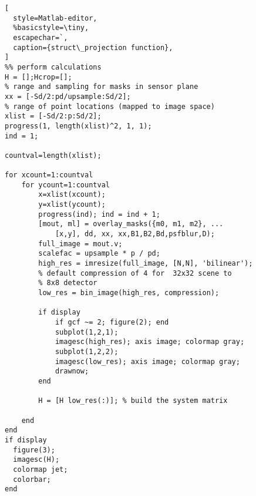 \begin{lstlisting}[
  style=Matlab-editor,
  %basicstyle=\tiny,
  escapechar=`,
  caption={struct\_projection function},
]
%% perform calculations
H = [];Hcrop=[];
% range and sampling for masks in sensor plane
xx = [-Sd/2:pd/upsample:Sd/2]; 
% range of point locations (mapped to image space)
xlist = [-Sd/2:p:Sd/2]; 
progress(1, length(xlist)^2, 1, 1);
ind = 1;

countval=length(xlist);

for xcount=1:countval
    for ycount=1:countval
        x=xlist(xcount);
        y=xlist(ycount);
        progress(ind); ind = ind + 1;
        [mout, ml] = overlay_masks({m0, m1, m2}, ...
            [x,y], dd, xx, xx,B1,B2,Bd,psfblur,D);
        full_image = mout.v;
        scalefac = upsample * p / pd;
        high_res = imresize(full_image, [N,N], 'bilinear');
        % default compression of 4 for  32x32 scene to 
        % 8x8 detector              
        low_res = bin_image(high_res, compression); 
        
        if display
            if gcf ~= 2; figure(2); end
            subplot(1,2,1);
            imagesc(high_res); axis image; colormap gray;
            subplot(1,2,2);
            imagesc(low_res); axis image; colormap gray;
            drawnow;
        end
        
        H = [H low_res(:)]; % build the system matrix
       
    end
end
if display
  figure(3); 
  imagesc(H); 
  colormap jet; 
  colorbar;
end
\end{lstlisting}


